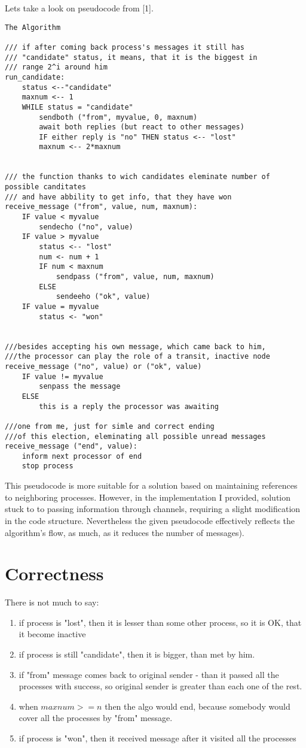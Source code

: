 \documentclass{article}
\begin{document}
Lets take a look on pseudocode from [1].
\begin{lstlisting}
The Algorithm

/// if after coming back process's messages it still has
/// "candidate" status, it means, that it is the biggest in
/// range 2^i around him
run_candidate:
    status <--"candidate"
    maxnum <-- 1
    WHILE status = "candidate"
        sendboth ("from", myvalue, 0, maxnum)
        await both replies (but react to other messages)
        IF either reply is "no" THEN status <-- "lost"
        maxnum <-- 2*maxnum


/// the function thanks to wich candidates eleminate number of possible canditates
/// and have abbility to get info, that they have won
receive_message ("from", value, num, maxnum):
    IF value < myvalue
        sendecho ("no", value)
    IF value > myvalue
        status <-- "lost"
        num <- num + 1
        IF num < maxnum
            sendpass ("from", value, num, maxnum)
        ELSE
            sendeeho ("ok", value)
    IF value = myvalue
        status <- "won"


///besides accepting his own message, which came back to him,
///the processor can play the role of a transit, inactive node
receive_message ("no", value) or ("ok", value)
    IF value != myvalue
        senpass the message
    ELSE
        this is a reply the processor was awaiting

///one from me, just for simle and correct ending
///of this election, eleminating all possible unread messages
receive_message ("end", value):
    inform next processor of end
    stop process
\end{lstlisting}

This pseudocode is more suitable for a solution based on maintaining references to neighboring processes. However, in the implementation I provided, solution stuck to to passing information through channels, requiring a slight modification in the code structure. Nevertheless the given pseudocode effectively reflects the algorithm's flow, as much, as it reduces the number of messages).


\section*{Correctness}
There is not much to say:
\begin{enumerate}
    \item if process is "lost", then it is lesser than some other process, so it is OK, that it become inactive
    \item if process is still "candidate", then it is bigger, than met by him.
    \item if "from" message comes back to original sender - than it passed all the processes with success, so original sender is greater than each one of the rest.
    \item when \(maxnum >= n\) then the algo would end, because somebody would cover all the processes by "from" message.
    \item if process is "won", then it received message after it visited all the processes
\end{enumerate}
\end{document}
